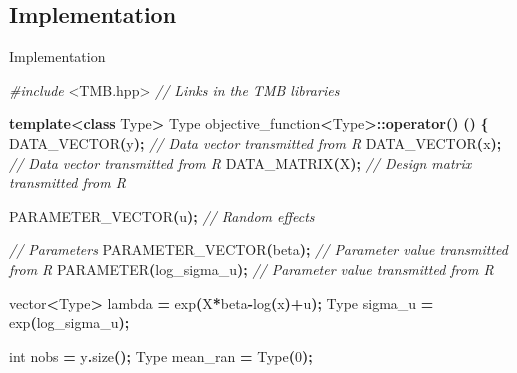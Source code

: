 \documentclass[aspectratio=169]{beamer}
\newenvironment{Shaded}{\begin{snugshade}}{\end{snugshade}}
\newcommand{\CommentTok}[1]{\textcolor[rgb]{0.56,0.35,0.01}{\textit{#1}}}
\newcommand{\DataTypeTok}[1]{\textcolor[rgb]{0.13,0.29,0.53}{#1}}
\newcommand{\DecValTok}[1]{\textcolor[rgb]{0.00,0.00,0.81}{#1}}
\newcommand{\ImportTok}[1]{#1}
\newcommand{\KeywordTok}[1]{\textcolor[rgb]{0.13,0.29,0.53}{\textbf{#1}}}
\newcommand{\NormalTok}[1]{#1}
\newcommand{\OperatorTok}[1]{\textcolor[rgb]{0.81,0.36,0.00}{\textbf{#1}}}
\newcommand{\PreprocessorTok}[1]{\textcolor[rgb]{0.56,0.35,0.01}{\textit{#1}}}
\begin{document}
\hypertarget{implementation}{%
\subsection{Implementation}\label{implementation}}

\begin{frame}[fragile]{Implementation}
\tiny

\begin{Shaded}
\begin{Highlighting}[]
\PreprocessorTok{\#include }\ImportTok{\textless{}TMB.hpp\textgreater{}}\PreprocessorTok{              }\CommentTok{// Links in the TMB libraries}

\KeywordTok{template}\OperatorTok{\textless{}}\KeywordTok{class}\NormalTok{ Type}\OperatorTok{\textgreater{}}
\NormalTok{Type objective\_function}\OperatorTok{\textless{}}\NormalTok{Type}\OperatorTok{\textgreater{}::}\KeywordTok{operator}\OperatorTok{()} \OperatorTok{()}
\OperatorTok{\{}
\NormalTok{  DATA\_VECTOR}\OperatorTok{(}\NormalTok{y}\OperatorTok{);}                               \CommentTok{// Data vector transmitted from R}
\NormalTok{  DATA\_VECTOR}\OperatorTok{(}\NormalTok{x}\OperatorTok{);}                       \CommentTok{// Data vector transmitted from R}
\NormalTok{  DATA\_MATRIX}\OperatorTok{(}\NormalTok{X}\OperatorTok{);}                       \CommentTok{// Design matrix transmitted from R}
  
\NormalTok{  PARAMETER\_VECTOR}\OperatorTok{(}\NormalTok{u}\OperatorTok{);}                      \CommentTok{// Random effects}
  
  \CommentTok{// Parameters}
\NormalTok{  PARAMETER\_VECTOR}\OperatorTok{(}\NormalTok{beta}\OperatorTok{);}         \CommentTok{// Parameter value transmitted from R}
\NormalTok{  PARAMETER}\OperatorTok{(}\NormalTok{log\_sigma\_u}\OperatorTok{);}               \CommentTok{// Parameter value transmitted from R}
  
\NormalTok{  vector}\OperatorTok{\textless{}}\NormalTok{Type}\OperatorTok{\textgreater{}}\NormalTok{ lambda  }\OperatorTok{=}\NormalTok{ exp}\OperatorTok{(}\NormalTok{X}\OperatorTok{*}\NormalTok{beta}\OperatorTok{{-}}\NormalTok{log}\OperatorTok{(}\NormalTok{x}\OperatorTok{)+}\NormalTok{u}\OperatorTok{);}
\NormalTok{  Type sigma\_u }\OperatorTok{=}\NormalTok{ exp}\OperatorTok{(}\NormalTok{log\_sigma\_u}\OperatorTok{);}
  
  \DataTypeTok{int}\NormalTok{ nobs }\OperatorTok{=}\NormalTok{ y}\OperatorTok{.}\NormalTok{size}\OperatorTok{();}
\NormalTok{  Type mean\_ran }\OperatorTok{=}\NormalTok{ Type}\OperatorTok{(}\DecValTok{0}\OperatorTok{);}
  

\end{Highlighting}
\end{Shaded}
\end{frame}
\end{document}
